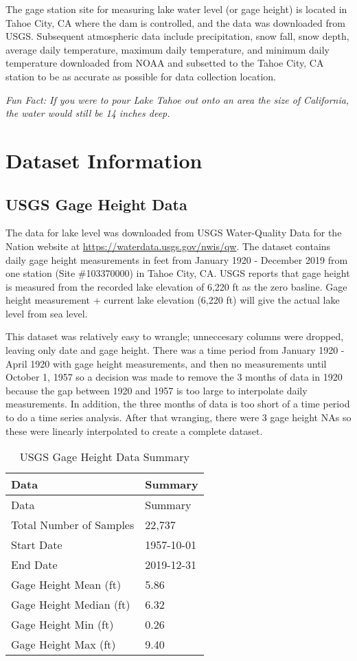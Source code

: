 \documentclass[12pt,]{article}
\begin{document}
The gage station site for measuring lake water level (or gage height) is
located in Tahoe City, CA where the dam is controlled, and the data was
downloaded from USGS. Subsequent atmospheric data include precipitation,
snow fall, snow depth, average daily temperature, maximum daily
temperature, and minimum daily temperature downloaded from NOAA and
subsetted to the Tahoe City, CA station to be as accurate as possible
for data collection location.

\emph{Fun Fact: If you were to pour Lake Tahoe out onto an area the size
of California, the water would still be 14 inches deep.}

\newpage

\hypertarget{dataset-information}{%
\section{Dataset Information}\label{dataset-information}}

\hypertarget{usgs-gage-height-data}{%
\subsection{USGS Gage Height Data}\label{usgs-gage-height-data}}

The data for lake level was downloaded from USGS Water-Quality Data for
the Nation website at \url{https://waterdata.usgs.gov/nwis/qw}. The
dataset contains daily gage height measurements in feet from January
1920 - December 2019 from one station (Site \#103370000) in Tahoe City,
CA. USGS reports that gage height is measured from the recorded lake
elevation of 6,220 ft as the zero basline. Gage height measurement +
current lake elevation (6,220 ft) will give the actual lake level from
sea level.

This dataset was relatively easy to wrangle; unneccesary columns were
dropped, leaving only date and gage height. There was a time period from
January 1920 - April 1920 with gage height measurements, and then no
measurements until October 1, 1957 so a decision was made to remove the
3 months of data in 1920 because the gap between 1920 and 1957 is too
large to interpolate daily measurements. In addition, the three months
of data is too short of a time period to do a time series analysis.
After that wranging, there were 3 gage height NAs so these were linearly
interpolated to create a complete dataset.

\begin{longtable}[]{@{}ll@{}}
\caption{\label{tab:table} USGS Gage Height Data Summary}\tabularnewline
\toprule
Data & Summary\tabularnewline
\midrule
\endfirsthead
\toprule
Data & Summary\tabularnewline
\midrule
\endhead
Total Number of Samples & 22,737\tabularnewline
Start Date & 1957-10-01\tabularnewline
End Date & 2019-12-31\tabularnewline
Gage Height Mean (ft) & 5.86\tabularnewline
Gage Height Median (ft) & 6.32\tabularnewline
Gage Height Min (ft) & 0.26\tabularnewline
Gage Height Max (ft) & 9.40\tabularnewline
\bottomrule
\end{longtable}
\end{document}
